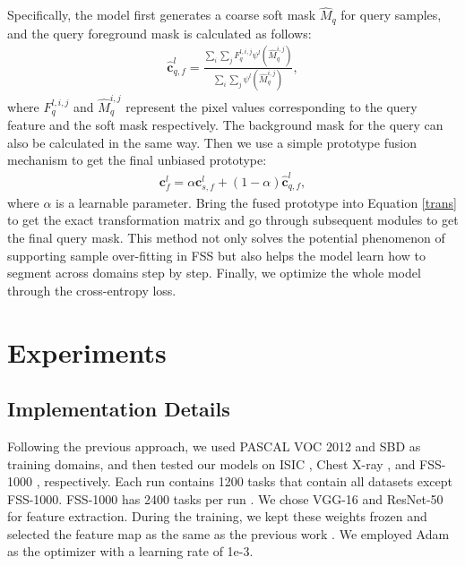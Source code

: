 \documentclass{bmvc2k}
\begin{document}
Specifically, the model first generates a coarse soft mask $\hat{M}_{q}$ for query samples, and the query foreground mask is calculated as follows:
\begin{eqnarray}
\mathbf{\hat{c}}^{l}_{q,f}=\frac{\sum_{i}\sum_{j}F^{l,i,j}_q\psi^l(\hat{M}_{q}^{i,j})}{\sum_{i}\sum_{j}\psi^l(\hat{M}_{q}^{i,j})},
\end{eqnarray}
where $F^{l,i,j}_q$ and $\hat{M}_{q}^{i,j}$ represent the pixel values corresponding to the query feature and the soft mask respectively. 
The background mask for the query can also be calculated in the same way. 
Then we use a simple prototype fusion mechanism to get the final unbiased prototype:
\begin{eqnarray}
\mathbf{c}^{l}_{f}=\alpha\mathbf{c}^{l}_{s,f}+(1-\alpha)\mathbf{\hat{c}}^{l}_{q,f},
\end{eqnarray}
where $\alpha$ is a learnable parameter.
Bring the fused prototype into Equation \ref{trans} to get the exact transformation matrix and go through subsequent modules to get the final query mask. 
This method not only solves the potential phenomenon of supporting sample over-fitting in FSS but also helps the model learn how to segment across domains step by step.
Finally, we optimize the whole model through the cross-entropy loss.


\section{Experiments}
\subsection{Implementation Details}
Following the previous approach, we used PASCAL VOC 2012 \cite{everingham2009pascal} and SBD \cite{hariharan2011semantic} as training domains, and then tested our models on ISIC \cite{tschandl2018ham10000, codella2019skin}, Chest X-ray \cite{candemir2013lung, jaeger2013automatic}, and FSS-1000 \cite{li2020fss}, respectively. 
Each run contains 1200 tasks that contain all datasets except FSS-1000. 
FSS-1000 has 2400 tasks per run \cite{lei2022cross}.
We chose VGG-16 \cite{simonyan2014very} and ResNet-50 \cite{he2016deep} for feature extraction. 
During the training, we kept these weights frozen and selected the feature map as the same as the previous work \cite{lei2022cross}. 
We employed Adam \cite{kingma2014adam} as the optimizer with a learning rate of 1e-3. 
\end{document}
